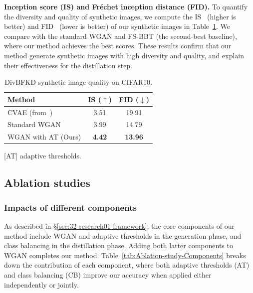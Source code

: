 \begin{foldable}
  \textbf{Inception score (IS) and Fr\'{e}chet inception distance (FID).} To quantify the diversity and quality of synthetic images, we compute the IS~\cite{salimans2016improved} (higher is better) and FID~\cite{heusel2017gans} (lower is better) of our synthetic images in Table~\ref{tab:IS-FID}.
  We compare with the standard WGAN and FS-BBT (the second-best baseline), where our method achieves the best scores.
  These results confirm that our method generate synthetic images with high diversity and quality, and explain their effectiveness for the distillation step.
\end{foldable}

\begin{table}[ht]
  \centering
  \begin{threeparttable}
    \caption{DivBFKD synthetic image quality on CIFAR10.}
    \label{tab:IS-FID}
    \begin{tabular}{l c c}
      \toprule
      \textbf{Method} & \textbf{IS ($\uparrow$)} & \textbf{FID ($\downarrow$)} \\
      \midrule
      CVAE (from~\cite{nguyen2022black}) & 3.51          & 19.91 \\
      Standard WGAN                      & 3.99          & 14.79 \\
      WGAN with AT (Ours)                & \textbf{4.42} & \textbf{13.96} \\
      \bottomrule
    \end{tabular}
    \begin{tablenotes}[flushleft] \footnotesize
    \item {[AT] adaptive thresholds.}
    \end{tablenotes}
  \end{threeparttable}
\end{table}

\subsection{Ablation studies}

\subsubsection{Impacts of different components}
\begin{foldable}
  As described in \S\ref{sec:32-research01-framework}, the core components of our method include WGAN and adaptive thresholds in the generation phase, and class balancing in the distillation phase.
  Adding both latter components to WGAN completes our method.
  Table~\ref{tab:Ablation-study-Components} breaks down the contribution of each component, where both adaptive thresholds (AT) and class balancing (CB) improve our accuracy when applied either independently or jointly.
\end{foldable}

